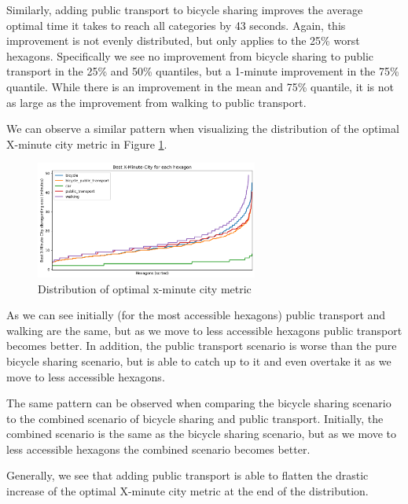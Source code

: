 Similarly, adding public transport to bicycle sharing improves the average optimal time it takes to reach all categories by 43 seconds.
Again, this improvement is not evenly distributed, but only applies to the 25\% worst hexagons.
Specifically we see no improvement from bicycle sharing to public transport in the 25\% and 50\% quantiles, but a 1-minute improvement in the 75\% quantile.
While there is an improvement in the mean and 75\% quantile, it is not as large as the improvement from walking to public transport.

We can observe a similar pattern when visualizing the distribution of the optimal X-minute city metric in Figure \ref{fig:optimal_x_minute_city_metric}.

\begin{figure}
  \begin{center}
    \includegraphics[width=0.65\textwidth]{Figures/results/minute_city_metric/best_x_minute_city}
  \end{center}
  \caption{Distribution of optimal x-minute city metric}
  \label{fig:optimal_x_minute_city_metric}
\end{figure}

As we can see initially (for the most accessible hexagons) public transport and walking are the same, but as we move to less accessible hexagons public transport becomes better.
In addition, the public transport scenario is worse than the pure bicycle sharing scenario, but is able to catch up to it and even overtake it as we move to less accessible hexagons.

The same pattern can be observed when comparing the bicycle sharing scenario to the combined scenario of bicycle sharing and public transport.
Initially, the combined scenario is the same as the bicycle sharing scenario, but as we move to less accessible hexagons the combined scenario becomes better.

Generally, we see that adding public transport is able to flatten the drastic increase of the optimal X-minute city metric at the end of the distribution.


